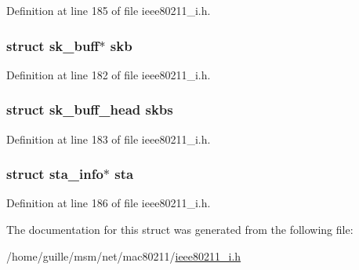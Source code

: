 Definition at line 185 of file ieee80211\-\_\-i.\-h.

\hypertarget{structieee80211__tx__data_aeba6836824708325a83121030f092c30}{
\subsubsection[{skb}]{\setlength{\rightskip}{0pt plus 5cm}struct sk\-\_\-buff$\ast$ skb}}\label{structieee80211__tx__data_aeba6836824708325a83121030f092c30}


Definition at line 182 of file ieee80211\-\_\-i.\-h.

\hypertarget{structieee80211__tx__data_aad317933678d4ee97c8e47099a46dadc}{
\subsubsection[{skbs}]{\setlength{\rightskip}{0pt plus 5cm}struct sk\-\_\-buff\-\_\-head skbs}}\label{structieee80211__tx__data_aad317933678d4ee97c8e47099a46dadc}


Definition at line 183 of file ieee80211\-\_\-i.\-h.

\hypertarget{structieee80211__tx__data_aafa9dadbeccd54b4a6b9f77f2908a093}{
\subsubsection[{sta}]{\setlength{\rightskip}{0pt plus 5cm}struct {\bf sta\-\_\-info}$\ast$ sta}}\label{structieee80211__tx__data_aafa9dadbeccd54b4a6b9f77f2908a093}


Definition at line 186 of file ieee80211\-\_\-i.\-h.



The documentation for this struct was generated from the following file\-:\begin{DoxyCompactItemize}
\item 
/home/guille/msm/net/mac80211/\hyperlink{ieee80211__i_8h}{ieee80211\-\_\-i.\-h}\end{DoxyCompactItemize}
